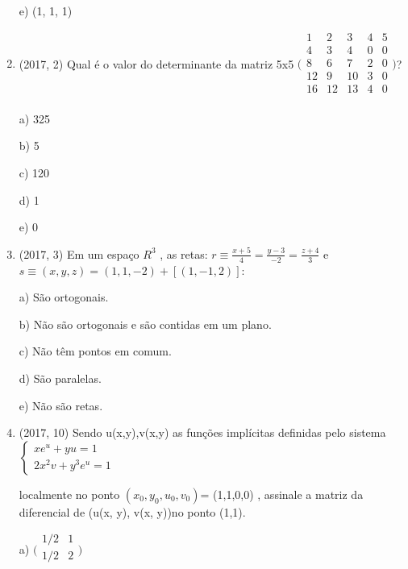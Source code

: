 \documentclass{article}
\begin{document}
\begin{enumerate}
e) (1, 1, 1)\newline



\item (2017, 2) Qual é o valor do determinante da matriz 5x5
$\Bigg(
    \begin{array}{ccccc}
    1 & 2 & 3 & 4 & 5 \\
    4 & 3 & 4 & 0 & 0 \\
    8 & 6 & 7 & 2 & 0 \\
    12 & 9 & 10 & 3 & 0 \\
    16 & 12 & 13 & 4 & 0 \\
\end{array}\Bigg)$?

a) 325

b) 5

c) 120

d) 1

e) 0\newline




\item (2017, 3) Em um espaço $R^3$ , as retas: $r \equiv \frac{x+5}{4} = \frac{y-3}{-2} = \frac{z+4}{3}$ e  $s \equiv (x,y,z) = (1,1,-2) + [(1,-1,2)]$:\newline

a) São ortogonais.

b) Não são ortogonais e são contidas em um plano.

c) Não têm pontos em comum.

d) São paralelas.

e) Não são retas.\newline







\item (2017, 10) Sendo u(x,y),v(x,y) as funções implícitas definidas pelo sistema 
$\left \{ \begin{matrix}
xe^u + yu =1\\
2x^2v + y^3 e^u =1
\end{matrix} \right.$

localmente no ponto $(x_0 , y_0 , u_0 , v_0 ) $= (1,1,0,0) , assinale a matriz da diferencial de (u(x, y), v(x, y))no ponto (1,1).


a) 
$\Bigg(
    \begin{array}{cc}
    1/2 & 1 \\
    1/2 & 2 \\
\end{array}\Bigg)$


\end{enumerate}
\end{document}
